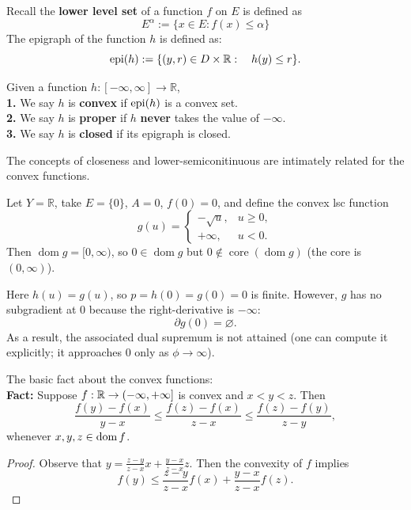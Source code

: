 Recall the \textbf{lower level set} of a function $f$ on $E$ is defined as 
$$
E^\alpha := \{ x \in E: f(x) \le \alpha \}
$$ 
The epigraph of the function $h$ is defined as:
\begin{equation}
	\operatorname*{epi}(h):= \{(y, r) \in D \times \mathbb{R}: \quad h(y) \le r \}.
\end{equation}

\begin{definition}
Given a function $h:[-\infty, \infty] \rightarrow \mathbb{R}$,\\
\textbf{1. }We say $h$ is \textbf{convex} if $\operatorname*{epi}(h)$ is a convex set. \\
\textbf{2. }We say $h$ is \textbf{proper} if $h$ \textbf{never} takes the value of $-\infty$. \\
\textbf{3. }We say $h$ is \textbf{closed} if its epigraph is closed.
\end{definition}
The concepts of closeness and lower-semiconitinuous are intimately related for the convex functions. 

\begin{example}
Let $Y=\mathbb{R}$, take $E=\{0\}$, $A=0$, $f(0)=0$, and define the convex lsc function
\[
g(u)=
\begin{cases}
-\sqrt{u}, & u\ge 0,\\
+\infty, & u<0.
\end{cases}
\]
Then $\operatorname{dom}g=[0,\infty)$, so $0\in\operatorname{dom}g$ but $0\notin\operatorname{core}(\operatorname{dom}g)$ (the core is $(0,\infty)$).

Here $h(u)=g(u)$, so $p=h(0)=g(0)=0$ is finite. However, $g$ has no subgradient at $0$ because the right-derivative is $-\infty$:
\[
\partial g(0)=\varnothing.
\]
As a result, the associated dual supremum is not attained (one can compute it explicitly; it approaches $0$ only as $\phi\to\infty$).
\end{example}

The basic fact about the convex functions:\\
\textbf{Fact:} Suppose $f : \mathbb{R} \to (-\infty, +\infty]$ is convex and $x < y < z$. Then
\[
	\frac{f(y) - f(x)}{y - x} \leq \frac{f(z) - f(x)}{z - x} \leq \frac{f(z) - f(y)}{z - y},
\]
whenever $x, y, z \in \operatorname{dom} f$.

\begin{proof}
Observe that $y = \frac{z-y}{z-x}x + \frac{y-x}{z-x}z$. Then the convexity of $f$ implies
\[
	f(y) \leq \frac{z-y}{z-x}f(x) + \frac{y-x}{z-x}f(z).
\]
\end{proof}


